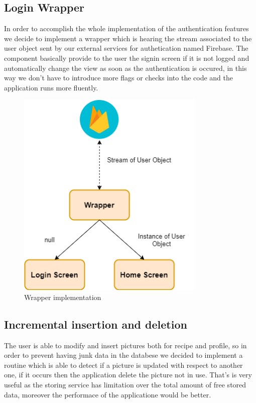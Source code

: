 \subsection{Login Wrapper}
In order to accomplish the whole implementation of the authentication features we decide to implement a wrapper which is hearing the stream associated to the user object sent by our external services for authetication named Firebase. The component basically provide to the user the signin screen if it is not logged and automatically change the view as soon as the authentication is occured, in this way we don't have to introduce more flags or checks into the code and the application runs more fluently.
\begin{figure}[H]
		\begin{center}
			\centering
			\includegraphics[width=0.8\textwidth]{img/Wrapper.png}
			\caption{Wrapper implementation}
		\end{center}
	\end{figure}
\subsection{Incremental insertion and deletion}
The user is able to modify and insert pictures both for recipe and profile, so in order to prevent having junk data in the databese we decided to implement a routine which is able to detect if a picture is updated with respect to another one, if it occurs then the application delete the picture not in use. That's is very useful as the storing service has limitation over the total amount of free stored data, moreover the performace of the applicatione would be better.